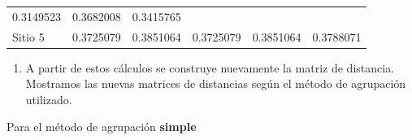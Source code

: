 \documentclass[]{book}
\providecommand{\tightlist}{%
  \setlength{\itemsep}{0pt}\setlength{\parskip}{0pt}}
\begin{document}
\begin{longtable}[]{@{}llllll@{}}
\begin{minipage}[t]{0.15\columnwidth}
0.3149523\strut
\end{minipage} & \begin{minipage}[t]{0.17\columnwidth}\raggedright\strut
0.3682008\strut
\end{minipage} & \begin{minipage}[t]{0.14\columnwidth}\raggedright\strut
0.3415765\strut
\end{minipage}\tabularnewline
\begin{minipage}[t]{0.12\columnwidth}\raggedright\strut
Sitio 5\strut
\end{minipage} & \begin{minipage}[t]{0.14\columnwidth}\raggedright\strut
0.3725079\strut
\end{minipage} & \begin{minipage}[t]{0.12\columnwidth}\raggedright\strut
0.3851064\strut
\end{minipage} & \begin{minipage}[t]{0.15\columnwidth}\raggedright\strut
0.3725079\strut
\end{minipage} & \begin{minipage}[t]{0.17\columnwidth}\raggedright\strut
0.3851064\strut
\end{minipage} & \begin{minipage}[t]{0.14\columnwidth}\raggedright\strut
0.3788071\strut
\end{minipage}\tabularnewline
\bottomrule
\end{longtable}

\begin{enumerate}
\def\labelenumi{\arabic{enumi}.}
\setcounter{enumi}{2}
\tightlist
\item
  A partir de estos cálculos se construye nuevamente la matriz de
  distancia. Mostramos las nuevas matrices de distancias según el método
  de agrupación utilizado.
\end{enumerate}

Para el método de agrupación \textbf{simple}
\end{document}
